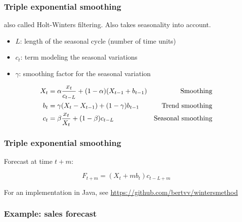 \documentclass{beamer}
\begin{document}
\begin{frame}
  \frametitle{Triple exponential smoothing}
  also called Holt-Winters filtering. Also takes seasonality into account.

  \begin{itemize}
    \item $L$: length of the seasonal cycle (number of time units)
    \item $c_t$: term modeling the seasonal variations
    \item $\gamma$: smoothing factor for the seasonal variation
  \end{itemize}

\begin{align*}
  X_{t} &= \alpha \frac{x_{t}}{c_{t-L}} + (1-\alpha) (X_{t-1} + b_{t-1}) & \textnormal{Smoothing}\\
  b_{t} &= \gamma (X_{t} - X_{t-1}) + (1-\gamma)b_{t-1} & \textnormal{Trend smoothing} \\
  c_{t} &= \beta \frac{x_{t}}{X_{t}} + (1-\beta)c_{t-L} & \textnormal{Seasonal smoothing} \\
\label{eq:HoltWinters}
\end{align*}

\end{frame}

\begin{frame}
  \frametitle{Triple exponential smoothing}

  Forecast at time $t + m$:

  \[ F_{t+m} = (X_{t} + mb_{t})c_{t-L+m} \]

  For an implementation in Java, see \url{https://github.com/bertvv/wintersmethod}
\end{frame}

\begin{frame}
  \frametitle{Example: sales forecast}

  \centering
\end{frame}
\end{document}
